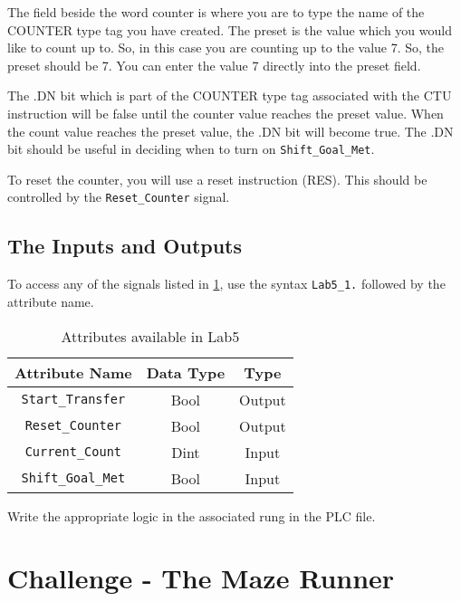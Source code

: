 The field beside the word counter is where you are to type the name of the COUNTER type tag you have created. The preset is the value which you would like to count up to. So, in this case you are counting up to the value 7. So, the preset should be 7. You can enter the value 7 directly into the preset field. 

The .DN bit which is part of the COUNTER type tag associated with the CTU instruction will be false until the counter value reaches the preset value. When the count value reaches the preset value, the .DN bit will become true. The .DN bit should be useful in deciding when to turn on \verb|Shift_Goal_Met|.


To reset the counter, you will use a reset instruction (RES). This should be controlled by the \verb|Reset_Counter| signal.


\subsection{The Inputs and Outputs}

To access any of the signals listed in \tableautorefname \ref{Table:Lab5_1Attributes}, use the syntax \verb|Lab5_1.| followed by the attribute name. 

\begin{table}[h]
\centering
\caption{Attributes available in Lab5}
\label{Table:Lab5_1Attributes}
\begin{tabular}{c c c}
\toprule
Attribute Name & Data Type & Type\\
\midrule
\verb|Start_Transfer| & Bool & Output \\
\verb|Reset_Counter| & Bool & Output \\
\midrule
\verb|Current_Count| & Dint & Input\\
\verb|Shift_Goal_Met| & Bool & Input\\
\bottomrule
\end{tabular}
\end{table}

Write the appropriate logic in the associated rung in the PLC file.

\TASignatureSlot


\section{Challenge - The Maze Runner}

